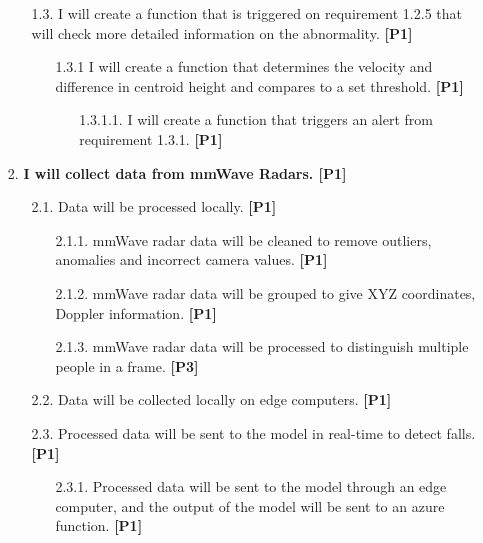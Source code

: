 \begin{enumerate}
       \begin{enumerate}[label*=\arabic*.]
        \item[1.3.] I will create a function that is triggered on requirement 1.2.5 that will check more detailed information on the abnormality. \textbf{[P1]}
        \begin{enumerate}[label*=\arabic*.]
            \item[1.3.1] I will create a function that determines the velocity and difference in centroid height and compares to a set threshold. \textbf{[P1]}
            \begin{enumerate}[label*=\arabic*.]
                \item[1.3.1.1.] I will create a function that triggers an alert from requirement 1.3.1. \textbf{[P1]}
            \end{enumerate}
        \end{enumerate}
    \end{enumerate}  
    
    
    \item[2.] \textbf{I will collect data from mmWave Radars. [P1]}
    \begin{enumerate}[label*=\arabic*.]
        \item[2.1.] Data will be processed locally. \textbf{[P1]}
        \begin{enumerate}[label*=\arabic*.]
            \item[2.1.1.] mmWave radar data will be cleaned to remove outliers, anomalies and incorrect camera values. \textbf{[P1]}
        \end{enumerate}
        \begin{enumerate}[label*=\arabic*.]
            \item[2.1.2.] mmWave radar data will be grouped to give XYZ coordinates, Doppler information. \textbf{[P1]}
        \end{enumerate}
        \begin{enumerate}[label*=\arabic*.]
            \item[2.1.3.] mmWave radar data will be processed to distinguish multiple people in a frame. \textbf{[P3]}
        \end{enumerate}
    \end{enumerate}
    \begin{enumerate}[label*=\arabic*.]
            \item[2.2.] Data will be collected locally on edge computers. \textbf{[P1]}
    \end{enumerate}
    \begin{enumerate}[label*=\arabic*.]
        \item[2.3.] Processed data will be sent to the model in real-time to detect falls. \textbf{[P1]}
        \begin{enumerate}[label*=\arabic*.]
            \item[2.3.1.] Processed data will be sent to the model through an edge computer, and the output of the model will be sent to an azure function. \textbf{[P1]}
        \end{enumerate}
    \end{enumerate}
    

\end{enumerate}
